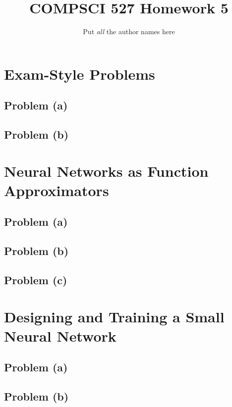 \documentclass[11pt]{article}
\title{COMPSCI 527 Homework 5}
\author{Put \emph{all} the author names here}
\date{}
\newcommand{\newsection}[1]{\newpage\section*{#1}}
\newcommand{\newproblem}[1]{\newpage\subsection*{#1}}
\newcommand{\includeCode}[1]{\VerbatimInput[fontsize=\small,fontshape=rm]{#1}}
\begin{document}
\maketitle
\section*{Exam-Style Problems}

\subsection*{Problem (a)}

\newproblem{Problem (b)}

\newsection{Neural Networks as Function Approximators}

\subsection*{Problem (a)}


\newproblem{Problem (b)}


\newproblem{Problem (c)}

\newsection{Designing and Training a Small Neural Network}

\subsection*{Problem (a)}


\newproblem{Problem (b)}
\end{document}

